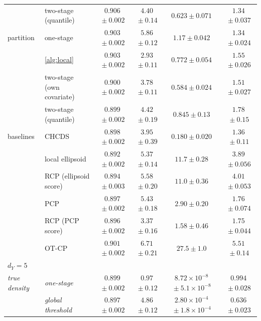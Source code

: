 \begin{table}[!t]
{\begin{tabular}{llcccc}
 & two-stage (quantile) & $0.906${\scriptsize${}\pm0.002$} & $4.40${\scriptsize${}\pm0.14$} & $0.623${\scriptsize${}\pm0.071$} & $1.34${\scriptsize${}\pm0.037$}\\
\addlinespace[2pt]
partition & one-stage & $0.903${\scriptsize${}\pm0.002$} & $5.86${\scriptsize${}\pm0.12$} & $1.17${\scriptsize${}\pm0.042$} & $1.34${\scriptsize${}\pm0.024$}\\
 & \cref{alg:local} & $0.903${\scriptsize${}\pm0.002$} & $2.93${\scriptsize${}\pm0.11$} & $0.772${\scriptsize${}\pm0.054$} & $1.55${\scriptsize${}\pm0.026$}\\
 & two-stage (own covariate) & $0.900${\scriptsize${}\pm0.002$} & $3.78${\scriptsize${}\pm0.11$} & $0.584${\scriptsize${}\pm0.024$} & $1.51${\scriptsize${}\pm0.027$}\\
 & two-stage (quantile) & $0.899${\scriptsize${}\pm0.002$} & $4.42${\scriptsize${}\pm0.19$} & $0.845${\scriptsize${}\pm0.13$} & $1.78${\scriptsize${}\pm0.15$}\\
\addlinespace[2pt]
baselines & CHCDS & $0.898${\scriptsize${}\pm0.002$} & $3.95${\scriptsize${}\pm0.39$} & $0.180${\scriptsize${}\pm0.020$} & $1.36${\scriptsize${}\pm0.11$}\\
 & local ellipsoid & $0.892${\scriptsize${}\pm0.002$} & $5.37${\scriptsize${}\pm0.14$} & $11.7${\scriptsize${}\pm0.28$} & $3.89${\scriptsize${}\pm0.056$}\\
 & RCP (ellipsoid score) & $0.894${\scriptsize${}\pm0.003$} & $5.58${\scriptsize${}\pm0.20$} & $11.0${\scriptsize${}\pm0.36$} & $4.01${\scriptsize${}\pm0.053$}\\
 & PCP & $0.897${\scriptsize${}\pm0.002$} & $5.43${\scriptsize${}\pm0.18$} & $2.90${\scriptsize${}\pm0.20$} & $1.76${\scriptsize${}\pm0.074$}\\
 & RCP (PCP score) & $0.896${\scriptsize${}\pm0.002$} & $3.37${\scriptsize${}\pm0.16$} & $1.58${\scriptsize${}\pm0.46$} & $1.75${\scriptsize${}\pm0.044$}\\
 & OT-CP & $0.901${\scriptsize${}\pm0.002$} & $6.71${\scriptsize${}\pm0.21$} & $27.5${\scriptsize${}\pm1.0$} & $5.51${\scriptsize${}\pm0.14$}\\
\midrule
\multicolumn{6}{l}{$d_Y=5$}\\
\addlinespace[2pt]
\textit{true density} & \textit{one-stage} & $0.899${\scriptsize${}\pm0.002$} & $0.97${\scriptsize${}\pm0.12$} & $8.72\times10^{-8}${\scriptsize${}\pm5.1\times10^{-8}$} & $0.994${\scriptsize${}\pm0.028$}\\
 & \textit{global threshold} & $0.897${\scriptsize${}\pm0.002$} & $4.86${\scriptsize${}\pm0.12$} & $2.80\times10^{-4}${\scriptsize${}\pm1.8\times10^{-4}$} & $0.636${\scriptsize${}\pm0.023$}\\

\end{tabular}}
\end{table}
